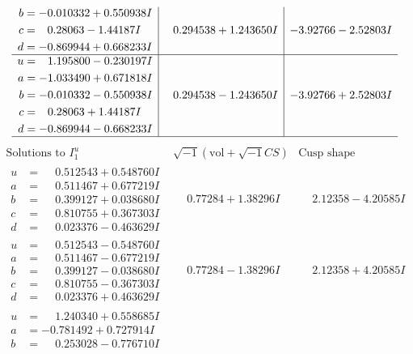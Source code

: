 \documentclass[1p]{elsarticle_modified}
\theoremstyle{definition}
\newcommand{\I}{\sqrt{-1}}
\begin{document}
$$\begin{array}{c|c|c}
\begin{aligned}
b &= -0.010332 + 0.550938 I \\
c &= \phantom{-}0.28063 - 1.44187 I \\
d &= -0.869944 + 0.668233 I\end{aligned}
 & \phantom{-}0.294538 + 1.243650 I & -3.92766 - 2.52803 I \\ \hline\begin{aligned}
u &= \phantom{-}1.195800 - 0.230197 I \\
a &= -1.033490 + 0.671818 I \\
b &= -0.010332 - 0.550938 I \\
c &= \phantom{-}0.28063 + 1.44187 I \\
d &= -0.869944 - 0.668233 I\end{aligned}
 & \phantom{-}0.294538 - 1.243650 I & -3.92766 + 2.52803 I\\
 \hline 
 \end{array}$$\newpage$$\begin{array}{c|c|c}  
\text{Solutions to }I^u_{1}& \I (\text{vol} + \sqrt{-1}CS) & \text{Cusp shape}\\
 \hline 
\begin{aligned}
u &= \phantom{-}0.512543 + 0.548760 I \\
a &= \phantom{-}0.511467 + 0.677219 I \\
b &= \phantom{-}0.399127 + 0.038680 I \\
c &= \phantom{-}0.810755 + 0.367303 I \\
d &= \phantom{-}0.023376 - 0.463629 I\end{aligned}
 & \phantom{-}0.77284 + 1.38296 I & \phantom{-}2.12358 - 4.20585 I \\ \hline\begin{aligned}
u &= \phantom{-}0.512543 - 0.548760 I \\
a &= \phantom{-}0.511467 - 0.677219 I \\
b &= \phantom{-}0.399127 - 0.038680 I \\
c &= \phantom{-}0.810755 - 0.367303 I \\
d &= \phantom{-}0.023376 + 0.463629 I\end{aligned}
 & \phantom{-}0.77284 - 1.38296 I & \phantom{-}2.12358 + 4.20585 I \\ \hline\begin{aligned}
u &= \phantom{-}1.240340 + 0.558685 I \\
a &= -0.781492 + 0.727914 I \\
b &= \phantom{-}0.253028 - 0.776710 I \\

\end{aligned}
\end{array}$$
\end{document}
